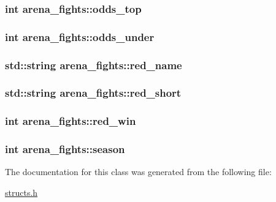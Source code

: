 \hypertarget{classarena__fights_a6f6ab9a7a094df07da794ea7509a3889}{
\subsubsection[{odds\-\_\-top}]{\setlength{\rightskip}{0pt plus 5cm}int arena\-\_\-fights\-::odds\-\_\-top}}\label{classarena__fights_a6f6ab9a7a094df07da794ea7509a3889}
\hypertarget{classarena__fights_a38f077818459049c616f6188df12ed9f}{
\subsubsection[{odds\-\_\-under}]{\setlength{\rightskip}{0pt plus 5cm}int arena\-\_\-fights\-::odds\-\_\-under}}\label{classarena__fights_a38f077818459049c616f6188df12ed9f}
\hypertarget{classarena__fights_ad205541a2a692c35f64252d3d2b592a2}{
\subsubsection[{red\-\_\-name}]{\setlength{\rightskip}{0pt plus 5cm}std\-::string arena\-\_\-fights\-::red\-\_\-name}}\label{classarena__fights_ad205541a2a692c35f64252d3d2b592a2}
\hypertarget{classarena__fights_adcca352c69a0254d8c0274481e399ff9}{
\subsubsection[{red\-\_\-short}]{\setlength{\rightskip}{0pt plus 5cm}std\-::string arena\-\_\-fights\-::red\-\_\-short}}\label{classarena__fights_adcca352c69a0254d8c0274481e399ff9}
\hypertarget{classarena__fights_a53884e23f0284d73161487c68ded427f}{
\subsubsection[{red\-\_\-win}]{\setlength{\rightskip}{0pt plus 5cm}int arena\-\_\-fights\-::red\-\_\-win}}\label{classarena__fights_a53884e23f0284d73161487c68ded427f}
\hypertarget{classarena__fights_a189a037aeb4a117c55f0fb43cc310279}{
\subsubsection[{season}]{\setlength{\rightskip}{0pt plus 5cm}int arena\-\_\-fights\-::season}}\label{classarena__fights_a189a037aeb4a117c55f0fb43cc310279}


The documentation for this class was generated from the following file\-:\begin{DoxyCompactItemize}
\item 
\hyperlink{structs_8h}{structs.\-h}\end{DoxyCompactItemize}
